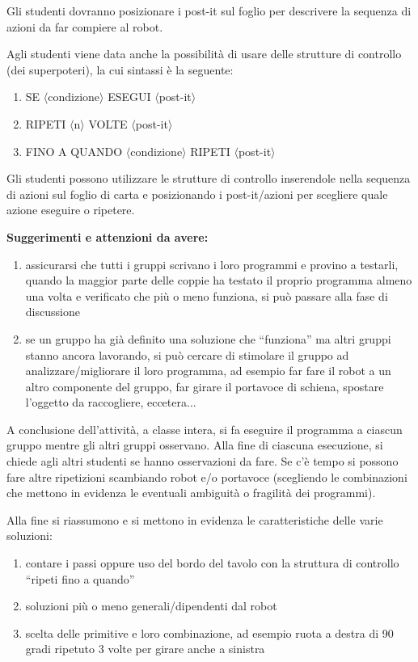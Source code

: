 \documentclass[12pt]{article}
\begin{document}
Gli studenti dovranno posizionare i post-it sul foglio per descrivere la sequenza di azioni da far compiere al robot.

Agli studenti viene data anche la possibilità di usare delle strutture di controllo (dei superpoteri), la cui sintassi è la seguente:
\begin{enumerate}
\item SE $\langle$condizione$\rangle$ ESEGUI $\langle$post-it$\rangle$
\item RIPETI $\langle$n$\rangle$ VOLTE $\langle$post-it$\rangle$
\item FINO A QUANDO $\langle$condizione$\rangle$ RIPETI $\langle$post-it$\rangle$
\end{enumerate}

Gli studenti possono utilizzare le strutture di controllo inserendole nella sequenza di azioni sul foglio di carta e posizionando i post-it/azioni per scegliere quale azione eseguire o ripetere.


\textbf{Suggerimenti e attenzioni da avere:}
\begin{enumerate}
\item assicurarsi che tutti i gruppi scrivano i loro programmi e provino a testarli, quando la maggior parte delle coppie ha testato il proprio programma almeno una volta e verificato che più o meno funziona, si può passare alla fase di discussione
\item se un gruppo ha già definito una soluzione che “funziona” ma altri gruppi stanno ancora lavorando, si può cercare di stimolare il gruppo ad analizzare/migliorare il loro programma, ad esempio far fare il robot a un altro componente del gruppo, far girare il portavoce di schiena, spostare l’oggetto da raccogliere, eccetera...
\end{enumerate}

A conclusione dell’attività, a classe intera, si fa eseguire il programma a ciascun gruppo mentre gli altri gruppi osservano. Alla fine di ciascuna esecuzione, si chiede agli altri studenti se hanno osservazioni da fare. Se c’è tempo si possono fare altre ripetizioni scambiando robot e/o portavoce (scegliendo le combinazioni che mettono in evidenza le eventuali ambiguità o fragilità dei programmi).

Alla fine si riassumono e si mettono in evidenza le caratteristiche delle varie soluzioni:
\begin{enumerate}
\item contare i passi oppure uso del bordo del tavolo con la struttura di controllo “ripeti fino a quando”
\item soluzioni più o meno generali/dipendenti dal robot
\item scelta delle primitive e loro combinazione,  ad esempio ruota a destra di 90 gradi ripetuto 3 volte per girare anche a sinistra
\end{enumerate}
\end{document}
